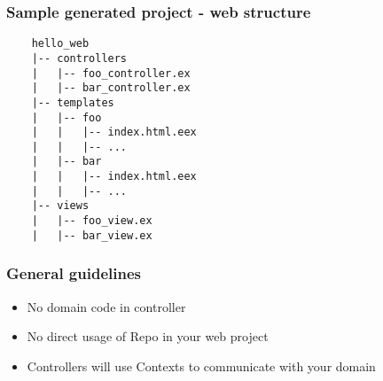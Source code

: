 \begin{frame}[fragile]
    \frametitle{Sample generated project - web structure}

    \begin{verbatim}
    hello_web
    |-- controllers
    |   |-- foo_controller.ex
    |   |-- bar_controller.ex
    |-- templates
    |   |-- foo
    |   |   |-- index.html.eex
    |   |   |-- ...
    |   |-- bar
    |   |   |-- index.html.eex
    |   |   |-- ...
    |-- views
    |   |-- foo_view.ex
    |   |-- bar_view.ex
    \end{verbatim} 

\end{frame}

\begin{frame}
    \frametitle{General guidelines}

    \begin{itemize}
        \item No domain code in controller
        \item No direct usage of Repo in your web project
        \item Controllers will use Contexts to communicate with your domain
    \end{itemize}

\end{frame}